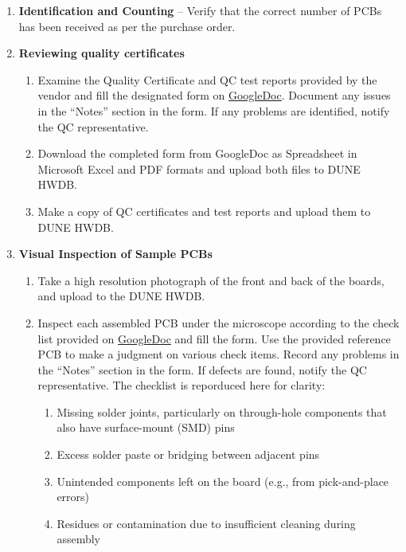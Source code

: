 \documentclass[a4paper,12pt]{article}
\begin{document}
    \begin{enumerate}
        \item \textbf{Identification and Counting} – Verify that the correct number of PCBs has been received as per the purchase order.
        \item \textbf{Reviewing quality certificates}
            \begin{enumerate}
                \item Examine the Quality Certificate and QC test reports provided by the vendor and fill the designated form on \href{https://docs.google.com/spreadsheets/d/10I7u4FrWQXx4R3NOPhapa5DsjlLhDk9keJTLW0Wgq5A/edit?gid=0#gid=0}{GoogleDoc}. Document any issues in the “Notes” section in the form. If any problems are identified, notify the QC representative.
                \item Download the completed form from GoogleDoc as Spreadsheet in Microsoft Excel and PDF formats and upload both files to DUNE HWDB.
                \item Make a copy of QC certificates and test reports and upload them to DUNE HWDB. 
            \end{enumerate}
        \item \textbf{Visual Inspection of Sample PCBs}
            \begin{enumerate}
                \item Take a high resolution photograph of the front and back of the boards, and upload to the DUNE HWDB.
                \item Inspect each assembled PCB under the microscope according to the check list provided on \href{https://docs.google.com/spreadsheets/d/10I7u4FrWQXx4R3NOPhapa5DsjlLhDk9keJTLW0Wgq5A/edit?gid=0#gid=0}{GoogleDoc} and fill the form. Use the provided reference PCB to make a judgment on various check items. Record any problems in the “Notes” section in the form. If defects are found, notify the QC representative. The checklist is reporduced here for clarity:
                  \begin{enumerate}
                        \item Missing solder joints, particularly on through-hole components that also have surface-mount (SMD) pins
                        \item Excess solder paste or bridging between adjacent pins
                        \item Unintended components left on the board (e.g., from pick-and-place errors)
                        \item Residues or contamination due to insufficient cleaning during assembly

\end{enumerate}
\end{enumerate}
\end{enumerate}
\end{document}
